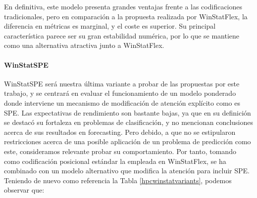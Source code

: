 En definitiva, este modelo presenta grandes ventajas frente a las codificaciones tradicionales, pero en comparación a la propuesta realizada por WinStatFlex, la diferencia en métricas es marginal, y el coste es superior. Su principal característica parece ser su gran estabilidad numérica, por lo que se mantiene como una alternativa atractiva junto a WinStatFlex.

\paragraph{WinStatSPE}

WinStatSPE será nuestra última variante a probar de las propuestas por este trabajo, y se centrará en evaluar el funcionamiento de un modelo ponderado donde interviene un mecanismo de modificación de atención explícito como es SPE. Las expectativas de rendimiento son bastante bajas, ya que en su definición se destacó su fortaleza en problemas de clasificación, y no mencionan conclusiones acerca de sus resultados en forecasting. Pero debido, a que no se estipularon restricciones acerca de una posible aplicación de un problema de predicción como este, consideramos relevante probar su comportamiento. Por tanto, tomando como codificación posicional estándar la empleada en WinStatFlex, se ha combinado con un modelo alternativo que modifica la atención para incluir SPE. Teniendo de nuevo como referencia la Tabla \ref{hpcwinstatvariants}, podemos observar que:

